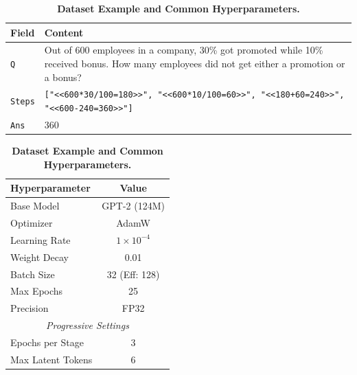 \begin{table}[h]
    \centering
    \small
    \caption{\textbf{Dataset Example and Common Hyperparameters.}}
    \label{tab:combined_data_hyper}
    \begin{minipage}[t]{0.48\textwidth}
        \centering
        \vspace{0pt}
        \renewcommand{\arraystretch}{1.3}
        \begin{tabular}{p{1.0cm}|p{5.8cm}}
        \toprule
        \textbf{Field} & \textbf{Content} \\
        \midrule
        \texttt{Q} & Out of 600 employees in a company, 30\% got promoted while 10\% received bonus. How many employees did not get either a promotion or a bonus? \\
        \midrule
        \texttt{Steps} & \footnotesize\texttt{["<<600*30/100=180>>", "<<600*10/100=60>>", "<<180+60=240>>", "<<600-240=360>>"]} \\
        \midrule
        \texttt{Ans} & 360 \\
        \bottomrule
        \end{tabular}
    \end{minipage}
    \hfill
    \begin{minipage}[t]{0.48\textwidth}
        \centering
        \vspace{0pt}
        \renewcommand{\arraystretch}{1.1}
        \begin{tabular}{l|c}
        \toprule
        \textbf{Hyperparameter} & \textbf{Value} \\
        \midrule
        Base Model & GPT-2 (124M) \\
        Optimizer & AdamW \\
        Learning Rate & $1 \times 10^{-4}$ \\
        Weight Decay & 0.01 \\
        Batch Size & 32 (Eff: 128) \\
        Max Epochs & 25 \\
        Precision & FP32 \\
        \multicolumn{2}{c}{\textit{Progressive Settings}} \\
        Epochs per Stage & 3 \\
        Max Latent Tokens & 6 \\
        \bottomrule
        \end{tabular}
    \end{minipage}
\end{table}

